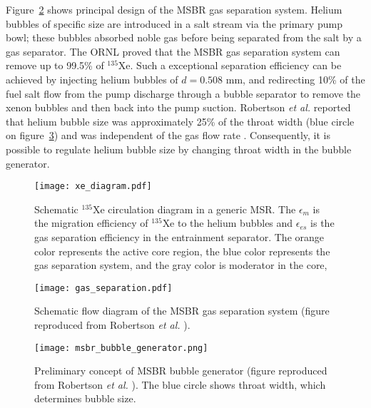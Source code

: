 Figure~\ref{fig:gas_removal_system} shows principal design of the \gls{MSBR} 
gas separation system. Helium bubbles of specific size are introduced in a 
salt stream via the primary pump bowl; these bubbles absorbed noble gas 
before being separated from the salt by a gas separator. The \gls{ORNL} proved 
that the \gls{MSBR} gas separation system can remove up to 99.5\% of 
$^{135}$Xe. Such a exceptional separation efficiency can be achieved by 
injecting helium bubbles of $d=0.508$ mm, and redirecting 10\% of the fuel 
salt flow from the pump discharge through a bubble separator to remove the 
xenon bubbles and then back into the pump suction. Robertson \emph{et al.} 
reported that helium bubble size was approximately 25\% of the 
throat width (blue circle on figure~\ref{fig:bubble_separator}) and was 
independent of the gas flow rate \cite{robertson_conceptual_1971}. 
Consequently, it is possible to regulate helium bubble size by changing throat 
width in the bubble generator.
\begin{figure}[htp!] %
	\centering
	\texttt{[image: xe\_diagram.pdf]}
	\caption{Schematic $^{135}$Xe circulation diagram in a generic \gls{MSR}. 
	The $\epsilon_m$ is the migration efficiency of $^{135}$Xe to the helium 
	bubbles and $\epsilon_{es}$ is the gas separation efficiency in the 
	entrainment separator. The orange color represents the active core region, 
	the blue color represents the gas separation system, and the gray color is 
	moderator in the core,}
	\label{fig:xe_diagram}
\end{figure}
\begin{figure}[htp!] %
  \centering
  \texttt{[image: gas\_separation.pdf]}
  \caption{Schematic flow diagram of the \gls{MSBR} gas separation system 
  (figure reproduced from Robertson \emph{et al.} 
  \cite{robertson_conceptual_1971}).}
  \label{fig:gas_removal_system}
\end{figure}
\begin{figure}[t] %
  \centering
  \texttt{[image: msbr\_bubble\_generator.png]}
  \caption{Preliminary concept of \gls{MSBR} bubble generator (figure 
  reproduced from Robertson \emph{et al.} \cite{robertson_conceptual_1971}). 
  The blue circle shows throat width, which determines bubble size.}
		\vspace{-0.25in}
  \label{fig:bubble_separator}
\end{figure}
